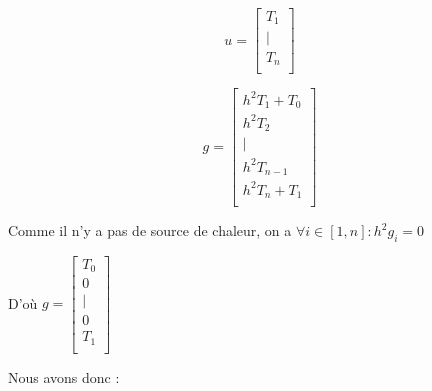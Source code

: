 \documentclass[11pt]{article}
\begin{document}
\begin{equation*}
  u = \left[
    \begin{array}{c}
      T_1 \\
      | \\
      T_n \\
    \end{array}
    \right]
\end{equation*}

\begin{equation*}
  g = \left[
    \begin{array}{c}
      h^2 T_1 + T_0 \\
      h^2 T_2 \\
      | \\
      h^2 T_{n-1} \\
      h^2T_n + T_1\\
    \end{array}
    \right]
\end{equation*}

Comme il n'y a pas de source de chaleur, on a $\forall i \in [ 1, n
] : h^2 g_i = 0$

D'où $g = \left[
  \begin{array}{c}
    T_0 \\
    0 \\
    | \\
    0 \\
    T_1 \\
  \end{array}
  \right]$

Nous avons donc :
\end{document}
